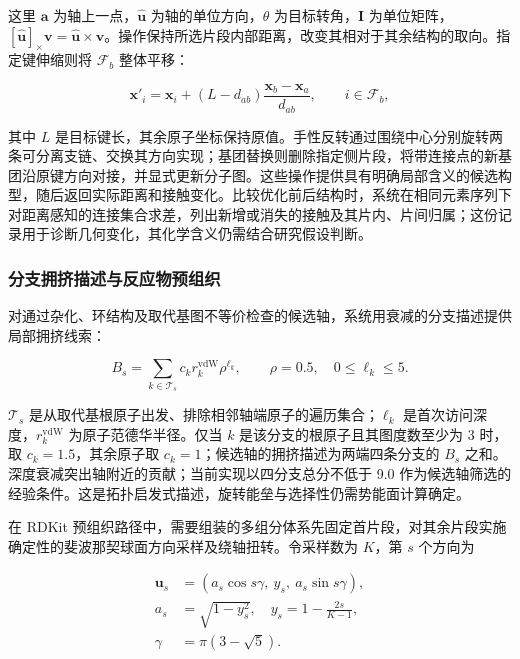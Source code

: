 这里 $\mathbf a$ 为轴上一点，$\hat{\mathbf u}$ 为轴的单位方向，$\theta$ 为目标转角，$\mathbf I$ 为单位矩阵，$[\hat{\mathbf u}]_\times\mathbf v=\hat{\mathbf u}\times\mathbf v$。操作保持所选片段内部距离，改变其相对于其余结构的取向。指定键伸缩则将 $\mathcal F_b$ 整体平移：

\begin{equation}\label{eq:methods-3}
\mathbf x'_i=\mathbf x_i+(L-d_{ab})\frac{\mathbf x_b-\mathbf x_a}{d_{ab}},\qquad i\in\mathcal F_b,
\end{equation}

其中 $L$ 是目标键长，其余原子坐标保持原值。手性反转通过围绕中心分别旋转两条可分离支链、交换其方向实现；基团替换则删除指定侧片段，将带连接点的新基团沿原键方向对接，并显式更新分子图。这些操作提供具有明确局部含义的候选构型，随后返回实际距离和接触变化。比较优化前后结构时，系统在相同元素序列下对距离感知的连接集合求差，列出新增或消失的接触及其片内、片间归属；这份记录用于诊断几何变化，其化学含义仍需结合研究假设判断。

\subsubsection{分支拥挤描述与反应物预组织}

对通过杂化、环结构及取代基图不等价检查的候选轴，系统用衰减的分支描述提供局部拥挤线索：

\begin{equation}\label{eq:methods-4}
B_s=\sum_{k\in\mathcal T_s}c_k r_k^{\mathrm{vdW}}\rho^{\ell_k},\qquad
\rho=0.5,\quad 0\leq\ell_k\leq5.
\end{equation}

$\mathcal T_s$ 是从取代基根原子出发、排除相邻轴端原子的遍历集合；$\ell_k$ 是首次访问深度，$r_k^{\mathrm{vdW}}$ 为原子范德华半径。仅当 $k$ 是该分支的根原子且其图度数至少为 3 时，取 $c_k=1.5$，其余原子取 $c_k=1$；候选轴的拥挤描述为两端四条分支的 $B_s$ 之和。深度衰减突出轴附近的贡献；当前实现以四分支总分不低于 9.0 作为候选轴筛选的经验条件。这是拓扑启发式描述，旋转能垒与选择性仍需势能面计算确定。

在 RDKit 预组织路径中，需要组装的多组分体系先固定首片段，对其余片段实施确定性的斐波那契球面方向采样及绕轴扭转。令采样数为 $K$，第 $s$ 个方向为

\begin{equation}\label{eq:methods-5}
\begin{aligned}
\mathbf u_s&=(a_s\cos s\gamma,\ y_s,\ a_s\sin s\gamma),\\
a_s&=\sqrt{1-y_s^2},\quad y_s=1-\frac{2s}{K-1},\\
\gamma&=\pi(3-\sqrt5).
\end{aligned}
\end{equation}

